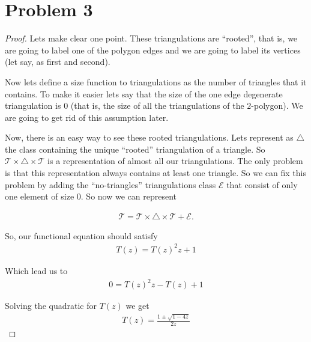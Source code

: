 ﻿\chapter{Problem 3}
\setcounter{theorem}{2}

\begin{proof}
    Lets make clear one point. These triangulations are ``rooted'', that is, we are going to label one of the polygon edges and
    we are going to label its vertices (let say, as first and second).\pn

    Now lets define a size function to triangulations as the number of triangles that it contains.
    To make it easier lets say that the size of the one edge degenerate triangulation is $0$ (that is, the size of all the triangulations
    of the $2$-polygon). We are going to get rid of this assumption later.\pn
    
    Now, there is an easy way to see these rooted triangulations. Lets represent as $\triangle$ the class containing the unique ``rooted'' 
    triangulation of a triangle. So $\mathcal{T} \times \triangle \times \mathcal{T}$ is a representation of almost all our triangulations.
    The only problem is that this representation always contains at least one triangle. So we can fix this problem by adding the ``no-triangles''
    triangulations class $\mathcal{E}$ that consist of only one element of size $0$. So now we can represent 
    
    \begin{align}
        \mathcal{T} = \mathcal{T} \times \triangle \times \mathcal{T} + \mathcal{E}.
    \end{align}
    
    So, our functional equation should satisfy
    \begin{align}
        T(z) = T(z)^2 z + 1
    \end{align}\pn
    
    Which lead us to
    \begin{align}
        0 = T(z)^2 z - T(z) + 1
    \end{align}\pn
    
    Solving the quadratic for $T(z)$ we get
    \begin{align}
        T(z) = \frac{1 \pm \sqrt{1 - 4z}}{2z}
    \end{align}\pn
    

\end{proof}
